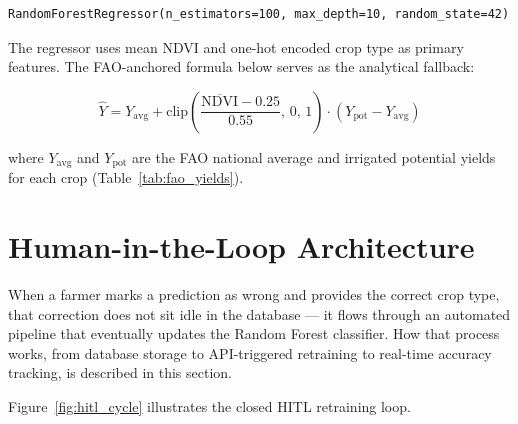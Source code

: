 \documentclass[12pt,a4paper,oneside]{report}
\begin{document}
\begin{lstlisting}[caption={Random Forest regressor configuration.}]
RandomForestRegressor(n_estimators=100, max_depth=10, random_state=42)
\end{lstlisting}

The regressor uses mean NDVI and one-hot encoded crop type as primary features.
The FAO-anchored formula below serves as the analytical fallback:

\begin{equation}
\hat{Y} = Y_\mathrm{avg} +
  \mathrm{clip}\!\left(\frac{\overline{\mathrm{NDVI}}-0.25}{0.55},\,0,\,1\right)
  \cdot (Y_\mathrm{pot} - Y_\mathrm{avg})
\label{eq:yield_formula}
\end{equation}

where $Y_\mathrm{avg}$ and $Y_\mathrm{pot}$ are the FAO national average and
irrigated potential yields for each crop (Table~\ref{tab:fao_yields}).

\section{Human-in-the-Loop Architecture}
\label{sec:hitl}

When a farmer marks a prediction as wrong and provides the correct crop type, that correction does not sit idle in the database — it flows through an automated pipeline that eventually updates the Random Forest classifier. How that process works, from database storage to API-triggered retraining to real-time accuracy tracking, is described in this section.

Figure~\ref{fig:hitl_cycle} illustrates the closed HITL retraining loop.
\end{document}
